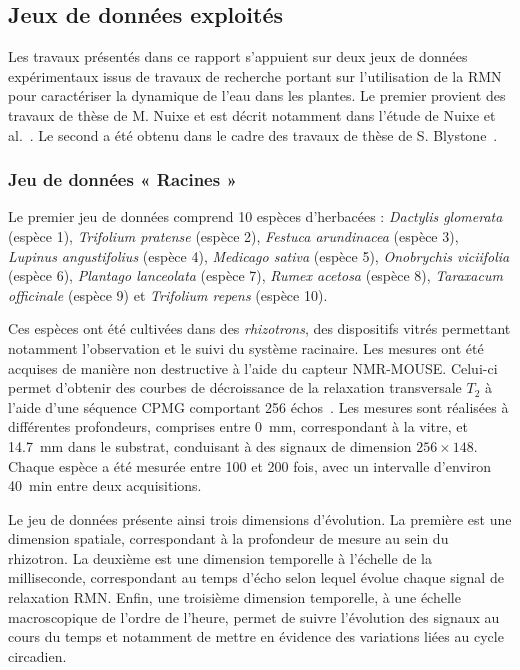 \documentclass[12pt,a4paper,twoside]{article}
\begin{document}
\subsection{Jeux de données exploités}
\label{subsec:donnees_intro}

Les travaux présentés dans ce rapport s'appuient sur deux jeux de données expérimentaux issus de travaux de recherche portant sur l'utilisation de la RMN pour caractériser la dynamique de l'eau dans les plantes. Le premier provient des travaux de thèse de M. Nuixe et est décrit notamment dans l'étude de Nuixe et al.~\cite{nuixe2024use}. Le second a été obtenu dans le cadre des travaux de thèse de S. Blystone~\cite{Shannan}.

\subsubsection{Jeu de données « Racines »}

Le premier jeu de données comprend \num{10} espèces d'herbacées : \textit{Dactylis glomerata} (espèce 1), \textit{Trifolium pratense} (espèce 2), \textit{Festuca arundinacea} (espèce 3), \textit{Lupinus angustifolius} (espèce 4), \textit{Medicago sativa} (espèce 5), \textit{Onobrychis viciifolia} (espèce 6), \textit{Plantago lanceolata} (espèce 7), \textit{Rumex acetosa} (espèce 8), \textit{Taraxacum officinale} (espèce 9) et \textit{Trifolium repens} (espèce 10).

Ces espèces ont été cultivées dans des \textit{rhizotrons}, des dispositifs vitrés permettant notamment l'observation et le suivi du système racinaire. Les mesures ont été acquises de manière non destructive à l'aide du capteur NMR-MOUSE. Celui-ci permet d'obtenir des courbes de décroissance de la relaxation transversale $T_2$ à l'aide d'une séquence CPMG comportant \num{256} échos~\cite{Meiboom1958}. Les mesures sont réalisées à différentes profondeurs, comprises entre \num{0}~mm, correspondant à la vitre, et \num{14.7}~mm dans le substrat, conduisant à des signaux de dimension $256 \times 148$. Chaque espèce a été mesurée entre 100 et 200 fois, avec un intervalle d'environ \num{40}~min entre deux acquisitions.

Le jeu de données présente ainsi trois dimensions d'évolution. La première est une dimension spatiale, correspondant à la profondeur de mesure au sein du rhizotron. La deuxième est une dimension temporelle à l'échelle de la milliseconde, correspondant au temps d'écho selon lequel évolue chaque signal de relaxation RMN. Enfin, une troisième dimension temporelle, à une échelle macroscopique de l'ordre de l'heure, permet de suivre l'évolution des signaux au cours du temps et notamment de mettre en évidence des variations liées au cycle circadien.
\end{document}

